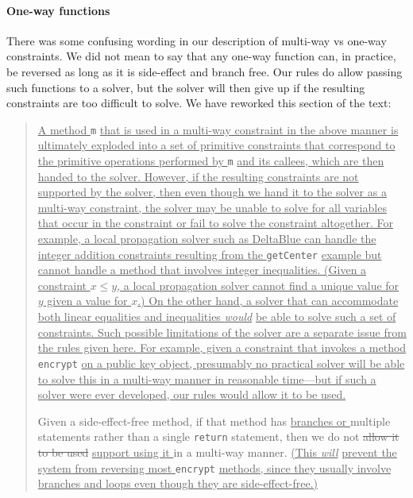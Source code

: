\documentclass[10pt,twocolumn]{article}
\providecommand{\DIFaddtex}[1]{{\protect\color{BLUE}\uline{#1}}} %
\providecommand{\DIFdeltex}[1]{{\protect\color{gray}\sout{#1}}}                      %
\providecommand{\DIFaddbegin}{} %
\providecommand{\DIFaddend}{} %
\providecommand{\DIFdelbegin}{} %
\providecommand{\DIFdelend}{} %
\providecommand{\DIFadd}[1]{\texorpdfstring{\DIFaddtex{#1}}{#1}} %
\providecommand{\DIFdel}[1]{\texorpdfstring{\DIFdeltex{#1}}{}} %
\begin{document}
\paragraph{One-way functions}
There was some confusing wording in our description of multi-way vs
one-way constraints. We did not mean to say that any one-way function
can, in practice, be reversed as long as it is side-effect and branch
free. Our rules do allow passing such functions to a solver, but the solver
will then give up if the resulting constraints are too difficult to solve.
We have reworked this section of the text:
\begin{quote}
\DIFaddbegin \DIFadd{A method }\verb|m| \DIFadd{that is used in a multi-way constraint in the above
manner is ultimately exploded into a set of primitive constraints that
correspond to the primitive operations performed by }\verb|m| \DIFadd{and its
callees, which are then handed to the solver.  However, if the
resulting constraints are not supported by the solver, then even
though we hand it to the solver as a multi-way constraint, the solver
may be unable to solve for all variables that occur in the constraint
or fail to solve the constraint altogether. For example, a local
propagation solver such as DeltaBlue can handle the integer addition
constraints resulting from the }\verb|getCenter| \DIFadd{example but cannot
handle a method that involves integer inequalities.  (Given a
constraint $x \leq y$, a local propagation solver cannot find a unique
value for $y$ given a value for $x$.)  On the other hand, a solver
that can accommodate both linear equalities and inequalities
}\emph{\DIFadd{would}} \DIFadd{be able to solve such a set of constraints. Such possible
limitations of the solver are a separate issue from the rules given
here. For example, given a constraint that invokes a method
}\verb|encrypt| \DIFadd{on a public key object, presumably no practical solver
will be able to solve this in a multi-way manner in reasonable
time---but if such a solver were ever developed, our rules would allow it to
be used.
}

\DIFaddend Given a side-effect-free method, if that method has \DIFaddbegin \DIFadd{branches or
}\DIFaddend multiple statements rather than a single {\tt return} statement, then
we do not \DIFdelbegin \DIFdel{allow it to be used }\DIFdelend \DIFaddbegin \DIFadd{support using it }\DIFaddend in a multi-way manner. \DIFaddbegin \DIFadd{(This }\emph{\DIFadd{will}}
\DIFadd{prevent the system from reversing most }\verb!encrypt! \DIFadd{methods, since they
usually involve branches and loops even though they are side-effect-free.)
}\DIFaddend
\end{quote}
\end{document}
